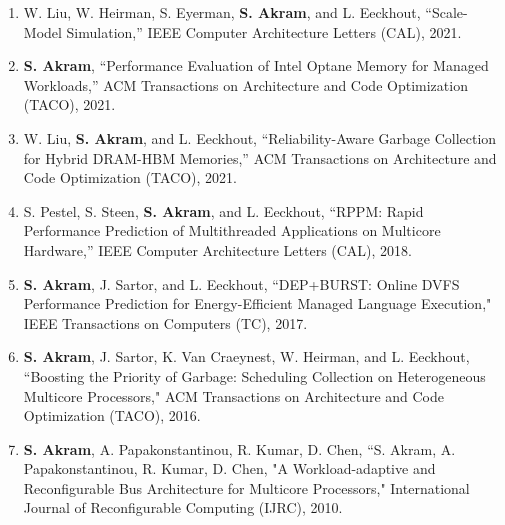 \documentclass[singlecolumn,singlespace,11pt,a4paper]{article}
\begin{document}
\begin{enumerate}
\item
W. Liu, W. Heirman, S. Eyerman, \textbf{S. Akram}, and L. Eeckhout, ``Scale-Model Simulation,'' IEEE Computer Architecture Letters (CAL), 2021.
\item
\textbf{S. Akram}, ``Performance Evaluation of Intel Optane Memory for Managed Workloads,'' ACM Transactions on Architecture and Code Optimization (TACO), 2021.
\item
W. Liu, \textbf{S. Akram}, and L. Eeckhout, ``Reliability-Aware Garbage Collection for Hybrid DRAM-HBM Memories,'' ACM Transactions on Architecture and Code Optimization (TACO), 2021.
\item
S. Pestel, S. Steen, \textbf{S. Akram}, and L. Eeckhout, ``RPPM: Rapid Performance Prediction of Multithreaded Applications on Multicore Hardware,'' IEEE Computer Architecture Letters (CAL), 2018.
\item
\textbf{S. Akram}, J. Sartor, and L. Eeckhout, ``DEP+BURST: Online DVFS Performance Prediction for Energy-Efficient Managed Language Execution," IEEE Transactions on Computers (TC), 2017.
\item
\textbf{S. Akram}, J. Sartor, K. Van Craeynest, W. Heirman, and L. Eeckhout, ``Boosting the Priority of Garbage: Scheduling Collection on Heterogeneous Multicore Processors," ACM Transactions on Architecture and Code Optimization (TACO), 2016.
\item
\textbf{S. Akram}, A. Papakonstantinou, R. Kumar, D. Chen, ``S. Akram, A. Papakonstantinou, R. Kumar, D. Chen, "A Workload-adaptive and Reconfigurable Bus Architecture for Multicore Processors," 
International Journal of Reconfigurable Computing (IJRC), 2010.
\end{enumerate}
\end{document}
